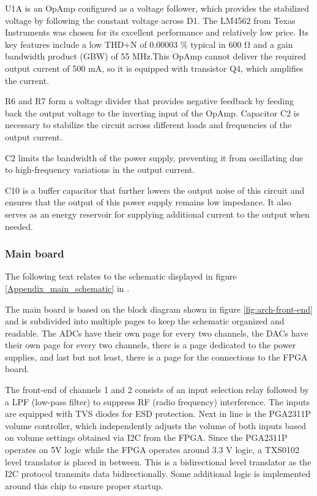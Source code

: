 U1A is an OpAmp configured as a voltage follower, which provides the stabilized voltage by following the constant voltage across D1. The LM4562 from Texas Instruments was chosen for its excellent performance and relatively low price. Its key features include a low THD+N of 0.00003 \% typical in 600 Ω and a gain bandwidth product (GBW) of 55 MHz.This OpAmp cannot deliver the required output current of 500 mA, so it is equipped with transistor Q4, which amplifies the current.

R6 and R7 form a voltage divider that provides negative feedback by feeding back the output voltage to the inverting input of the OpAmp. Capacitor C2 is necessary to stabilize the circuit across different loads and frequencies of the output current.

C2 limits the bandwidth of the power supply, preventing it from oscillating due to high-frequency variations in the output current.

C10 is a buffer capacitor that further lowers the output noise of this circuit and ensures that the output of this power supply remains low impedance. It also serves as an energy reservoir for supplying additional current to the output when needed.

\subsubsection{Main board}
The following text relates to the schematic displayed in figure \ref{Appendix_main_schematic} in .

The main board is based on the block diagram shown in figure \ref{fig:arch-front-end} and is subdivided into multiple pages to keep the schematic organized and readable. The ADCs have their own page for every two channels, the DACs have their own page for every two channels, there is a page dedicated to the power supplies, and last but not least, there is a page for the connections to the FPGA board.

The front-end of channels 1 and 2 consists of an input selection relay followed by a LPF (low-pass filter) to suppress RF (radio frequency) interference. The inputs are equipped with TVS diodes for ESD protection. Next in line is the PGA2311P volume controller, which independently adjusts the volume of both inputs based on volume settings obtained via I2C from the FPGA. Since the PGA2311P operates on 5V logic while the FPGA operates around 3.3 V logic, a TXS0102 level translator is placed in between. This is a bidirectional level translator as the I2C protocol transmits data bidirectionally. Some additional logic is implemented around this chip to ensure proper startup.

